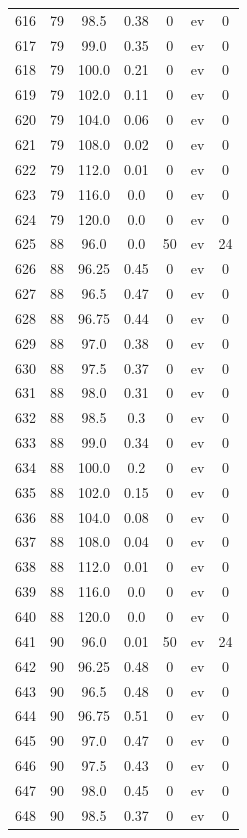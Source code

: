 \documentclass[12pt,a4paper]{article}
\begin{document}
\begin{tabular}{r|cccccc}
	616 & 79 & 98.5 & 0.38 & 0 & ev & 0 \\
	617 & 79 & 99.0 & 0.35 & 0 & ev & 0 \\
	618 & 79 & 100.0 & 0.21 & 0 & ev & 0 \\
	619 & 79 & 102.0 & 0.11 & 0 & ev & 0 \\
	620 & 79 & 104.0 & 0.06 & 0 & ev & 0 \\
	621 & 79 & 108.0 & 0.02 & 0 & ev & 0 \\
	622 & 79 & 112.0 & 0.01 & 0 & ev & 0 \\
	623 & 79 & 116.0 & 0.0 & 0 & ev & 0 \\
	624 & 79 & 120.0 & 0.0 & 0 & ev & 0 \\
	625 & 88 & 96.0 & 0.0 & 50 & ev & 24 \\
	626 & 88 & 96.25 & 0.45 & 0 & ev & 0 \\
	627 & 88 & 96.5 & 0.47 & 0 & ev & 0 \\
	628 & 88 & 96.75 & 0.44 & 0 & ev & 0 \\
	629 & 88 & 97.0 & 0.38 & 0 & ev & 0 \\
	630 & 88 & 97.5 & 0.37 & 0 & ev & 0 \\
	631 & 88 & 98.0 & 0.31 & 0 & ev & 0 \\
	632 & 88 & 98.5 & 0.3 & 0 & ev & 0 \\
	633 & 88 & 99.0 & 0.34 & 0 & ev & 0 \\
	634 & 88 & 100.0 & 0.2 & 0 & ev & 0 \\
	635 & 88 & 102.0 & 0.15 & 0 & ev & 0 \\
	636 & 88 & 104.0 & 0.08 & 0 & ev & 0 \\
	637 & 88 & 108.0 & 0.04 & 0 & ev & 0 \\
	638 & 88 & 112.0 & 0.01 & 0 & ev & 0 \\
	639 & 88 & 116.0 & 0.0 & 0 & ev & 0 \\
	640 & 88 & 120.0 & 0.0 & 0 & ev & 0 \\
	641 & 90 & 96.0 & 0.01 & 50 & ev & 24 \\
	642 & 90 & 96.25 & 0.48 & 0 & ev & 0 \\
	643 & 90 & 96.5 & 0.48 & 0 & ev & 0 \\
	644 & 90 & 96.75 & 0.51 & 0 & ev & 0 \\
	645 & 90 & 97.0 & 0.47 & 0 & ev & 0 \\
	646 & 90 & 97.5 & 0.43 & 0 & ev & 0 \\
	647 & 90 & 98.0 & 0.45 & 0 & ev & 0 \\
	648 & 90 & 98.5 & 0.37 & 0 & ev & 0 \\

\end{tabular}
\end{document}
